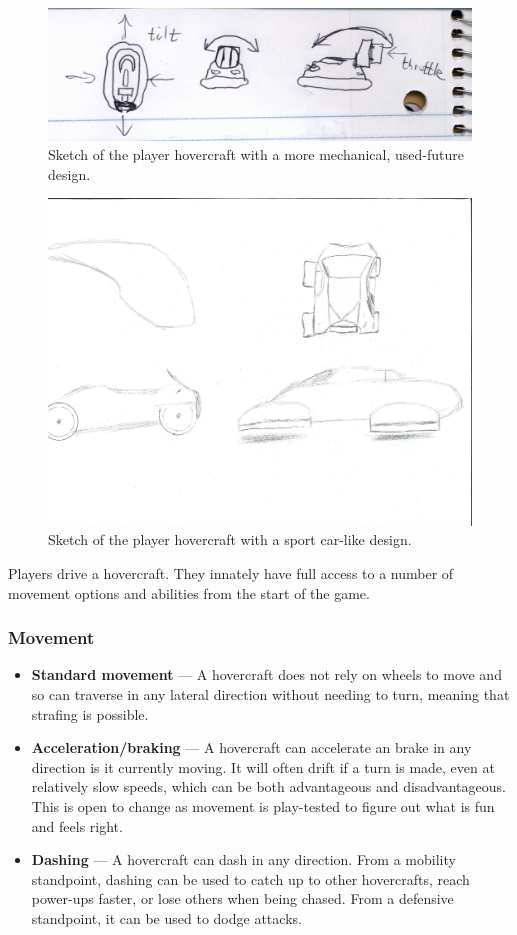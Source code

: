 \documentclass{article}
\theoremstyle{definition}
\begin{document}
\begin{figure}[htpb]
  \centering
  \includegraphics[width=0.8\linewidth]{Brainstorming_003.png}
  \caption{Sketch of the player hovercraft with a more mechanical, used-future
  design.}
\label{fig:Brainstorming_003}
\end{figure}

\begin{figure}[htpb]
  \centering
  \includegraphics[width=0.8\linewidth]{austin_car1.pdf}
  \caption{Sketch of the player hovercraft with a sport car-like design.}
\label{fig:austin_car1}
\end{figure}

Players drive a hovercraft. They innately have full access to a number of
movement options and abilities from the start of the game.

\subsubsection{Movement}

\begin{itemize}
  \item \textbf{Standard movement} --- A hovercraft does not rely on wheels to
    move and so can traverse in any lateral direction without needing to turn,
    meaning that strafing is possible.
  \item \textbf{Acceleration/braking} --- A hovercraft can accelerate an brake
    in any direction is it currently moving. It will often drift if a turn is
    made, even at relatively slow speeds, which can be both advantageous and
    disadvantageous. This is open to change as movement is play-tested to
    figure out what is fun and feels right.
  \item \textbf{Dashing} --- A hovercraft can dash in any direction. From
    a mobility standpoint, dashing can be used to catch up to other
    hovercrafts, reach power-ups faster, or lose others when being chased. From
    a defensive standpoint, it can be used to dodge attacks.
\end{itemize}
\end{document}
